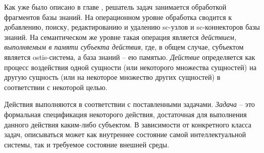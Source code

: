 Как уже было описано в главе , решатель задач занимается обработкой фрагментов базы знаний. На операционном уровне обработка сводится к добавлению, поиску, редактированию и удалению sc-узлов и sc-коннекторов базы знаний. На семантическом же уровне такая операция является \textit{действием, выполняемым в памяти субъекта действия}, где, в общем случае, субъектом является ostis-система, а база знаний -- ею памятью. \textit{Действие} определяется как процесс воздействия одной сущности (или некоторого множества сущностей) на другую сущность (или на некоторое множество других сущностей) в соответствии с некоторой целью.

Действия выполняются в соответствии с поставленными задачами.  \textit{Задача} -- это формальная спецификация некоторого действия, достаточная для выполнения данного действия каким-либо субъектом. В зависимости от конкретного класса задач, описываться может как внутреннее состояние самой интеллектуальной системы, так и требуемое состояние внешней среды.

